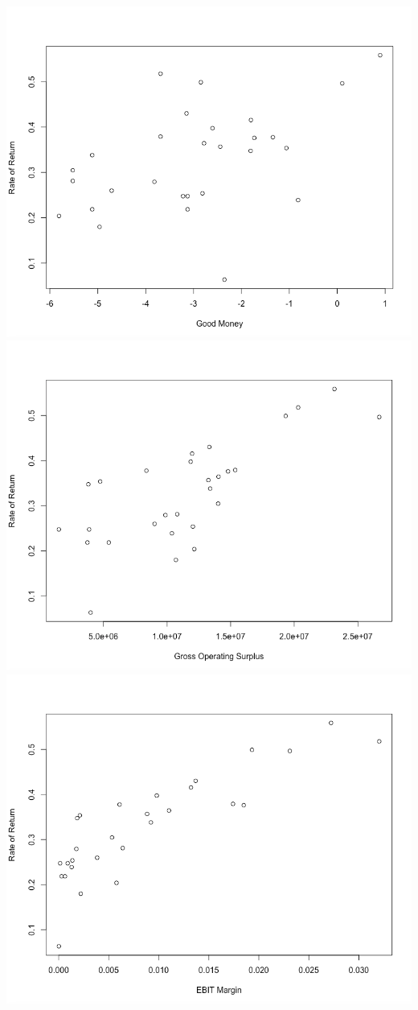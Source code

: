 \documentclass[12pt,letterpaper]{article}
\begin{document}
\begin{center}
\includegraphics[scale=0.3]{pic11.png}
\includegraphics[scale=0.3]{pic12.png}
\includegraphics[scale=0.3]{pic13.png}
\end{center}
\end{document}
